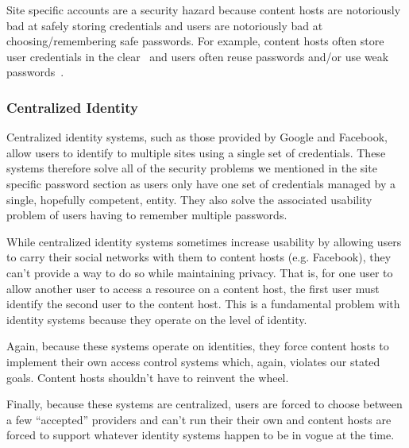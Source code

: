\documentclass[pdftex,12pt,a4papaer]{report}
\begin{document}

Site specific accounts are a security hazard because content hosts are
notoriously bad at safely storing credentials and users are notoriously bad at
choosing/remembering safe passwords. For example, content hosts often store user
credentials in the clear~\cite{plaintext} and users often reuse passwords and/or
use weak passwords~\cite{ms-passwords}.


\subsubsection{Centralized Identity}

Centralized identity systems, such as those provided by Google and Facebook,
allow users to identify to multiple sites using a single set of credentials.
These systems therefore solve all of the security problems we mentioned in the
site specific password section as users only have one set of credentials managed
by a single, hopefully competent, entity. They also solve the associated
usability problem of users having to remember multiple passwords.

While centralized identity systems sometimes increase usability by allowing
users to carry their social networks with them to content hosts (e.g. Facebook),
they can't provide a way to do so while maintaining privacy. That is, for one
user to allow another user to access a resource on a content host, the first
user must identify the second user to the content host. This is a fundamental
problem with identity systems because they operate on the level of identity.

Again, because these systems operate on identities, they force content hosts to
implement their own access control systems which, again, violates our stated
goals. Content hosts shouldn't have to reinvent the wheel.

Finally, because these systems are centralized, users are forced to choose
between a few ``accepted'' providers and can't run their their own and content
hosts are forced to support whatever identity systems happen to be in vogue at
the time.
\end{document}
